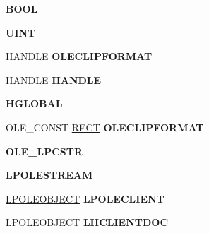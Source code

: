\begin{DoxyCompactItemize}
{\bfseries B\+O\+OL}
\item 
\mbox{\label{struct___o_l_e_o_b_j_e_c_t_v_t_b_l_adef2322bcbfd195b9badbf1645f40d25}} 
{\bfseries U\+I\+NT}
\item 
\mbox{\label{struct___o_l_e_o_b_j_e_c_t_v_t_b_l_a02aae7833d677826f03d487b4ecaaf63}} 
\hyperlink{interfacevoid}{H\+A\+N\+D\+LE} {\bfseries O\+L\+E\+C\+L\+I\+P\+F\+O\+R\+M\+AT}
\item 
\mbox{\label{struct___o_l_e_o_b_j_e_c_t_v_t_b_l_a45c4495c8cc4d5ae5063e6da187cab10}} 
\hyperlink{interfacevoid}{H\+A\+N\+D\+LE} {\bfseries H\+A\+N\+D\+LE}
\item 
\mbox{\label{struct___o_l_e_o_b_j_e_c_t_v_t_b_l_a0032ef9d8b73295f76bb7d53d455240f}} 
{\bfseries H\+G\+L\+O\+B\+AL}
\item 
\mbox{\label{struct___o_l_e_o_b_j_e_c_t_v_t_b_l_affd983da48900d21ab7f81c9532c3ead}} 
O\+L\+E\+\_\+\+C\+O\+N\+ST \hyperlink{structtag_r_e_c_t}{R\+E\+CT} {\bfseries O\+L\+E\+C\+L\+I\+P\+F\+O\+R\+M\+AT}
\item 
\mbox{\label{struct___o_l_e_o_b_j_e_c_t_v_t_b_l_a0655b04fc900dc6bac206cbffe193167}} 
{\bfseries O\+L\+E\+\_\+\+L\+P\+C\+S\+TR}
\item 
\mbox{\label{struct___o_l_e_o_b_j_e_c_t_v_t_b_l_a7b6c09fbe1e550f597078fccabf6fd59}} 
{\bfseries L\+P\+O\+L\+E\+S\+T\+R\+E\+AM}
\item 
\mbox{\label{struct___o_l_e_o_b_j_e_c_t_v_t_b_l_aca9fcd1ccd5dd01db992f814b937ab8e}} 
\hyperlink{struct___o_l_e_o_b_j_e_c_t}{L\+P\+O\+L\+E\+O\+B\+J\+E\+CT} {\bfseries L\+P\+O\+L\+E\+C\+L\+I\+E\+NT}
\item 
\mbox{\label{struct___o_l_e_o_b_j_e_c_t_v_t_b_l_aafe535399a8b5798d274003e4ccd0d04}} 
\hyperlink{struct___o_l_e_o_b_j_e_c_t}{L\+P\+O\+L\+E\+O\+B\+J\+E\+CT} {\bfseries L\+H\+C\+L\+I\+E\+N\+T\+D\+OC}
\item 

\end{DoxyCompactItemize}
